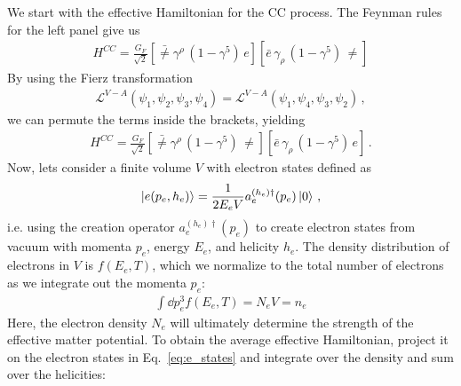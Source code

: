 \documentclass[draft=True]{revtex4-2}
\begin{document}
We start with the effective Hamiltonian for the CC process. The Feynman rules for the left panel give us 
\begin{align}
    H^{CC} = \frac{G_F}{\sqrt{2}}\left[ \bar\ne \gamma^\rho\, (1- \gamma^5)\, e \right] \left[\bar e \,\gamma_\rho\, (1- \gamma^5)\, \ne \right]
\end{align}
By using the Fierz transformation 
\begin{align}
    \mathcal{L}^{V-A}(\psi_1,\psi_2,\psi_3,\psi_4) = \mathcal{L}^{V-A}(\psi_1,\psi_4,\psi_3,\psi_2)\,,
\end{align}
we can permute the terms inside the brackets, yielding
\begin{align}\label{eq:H_fierz}
    H^{CC} = \frac{G_F}{\sqrt{2}}\left[ \bar\ne \gamma^\rho\, (1- \gamma^5)\, \ne \right] \left[\bar e \,\gamma_\rho\, (1- \gamma^5)\, e \right]\,.
\end{align}
Now, lets consider a finite volume $V$ with electron states defined as 
\begin{align}\label{eq:e_states}
    \ket{e(p_e,h_e)} = \frac{1}{2E_eV}a_e^{(h_e)\dagger}(p_e)\ket{0}\,,
\end{align}
i.e. using the creation operator $a_e^{(h_e)\dagger}(p_e)$ to create electron states from vacuum with momenta $p_e$, energy $E_e$, and helicity $h_e$.
The density distribution of electrons in $V$ is $f(E_e,T)$, which we normalize to the total number of electrons as we integrate out the momenta $p_e$:
\begin{align}\label{eq:e_density}
    \int \dd p_e^3 f(E_e,T) = N_e V = n_e
\end{align}
Here, the electron density $N_e$ will ultimately determine the strength of the effective matter potential. 
To obtain the average effective Hamiltonian, project it on the electron states in Eq.~\ref{eq:e_states} and integrate over the density and sum over the helicities:
\end{document}
